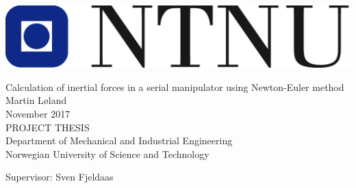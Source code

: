 
\thispagestyle{empty}
\mbox{}\\[2pc]
\includegraphics[scale=0.6]{img/ntnu}
\mbox{}\\[6pc]
\begin{center}
\Huge{Calculation of inertial forces in a serial manipulator using Newton-Euler method}\\[2pc]

\Large{Martin Løland}\\[1pc]
\large{November 2017}\\[2pc]

PROJECT THESIS\\
Department of Mechanical and Industrial Engineering\\
Norwegian University of Science and Technology
\end{center}
\vfill

\noindent Supervisor: Sven Fjeldaas
